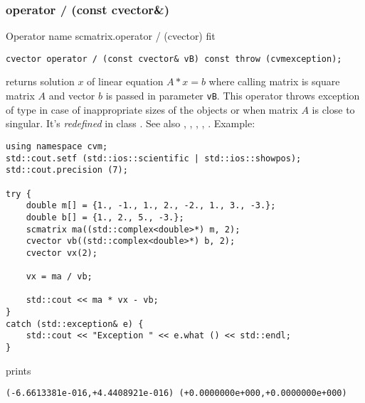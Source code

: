 \subsubsection{operator / (const cvector\&)}
Operator%
\pdfdest name {scmatrix.operator / (cvector)} fit
\begin{verbatim}
cvector operator / (const cvector& vB) const throw (cvmexception);
\end{verbatim}
returns solution $x$ of linear equation
$A*x=b$ where calling matrix is square matrix $A$
and vector $b$ is passed in parameter \verb"vB".
This operator throws exception 
of type 
in case of inappropriate sizes
of the objects or when  matrix $A$ is close to singular.
It's \emph{redefined} in class .
See also , 
, 
, 
, .
Example:
\begin{Verbatim}
using namespace cvm;
std::cout.setf (std::ios::scientific | std::ios::showpos);
std::cout.precision (7);

try {
    double m[] = {1., -1., 1., 2., -2., 1., 3., -3.};
    double b[] = {1., 2., 5., -3.};
    scmatrix ma((std::complex<double>*) m, 2);
    cvector vb((std::complex<double>*) b, 2);
    cvector vx(2);

    vx = ma / vb;

    std::cout << ma * vx - vb;
}
catch (std::exception& e) {
    std::cout << "Exception " << e.what () << std::endl;
}
\end{Verbatim}
prints
\begin{Verbatim}
(-6.6613381e-016,+4.4408921e-016) (+0.0000000e+000,+0.0000000e+000)
\end{Verbatim}
\newpage





